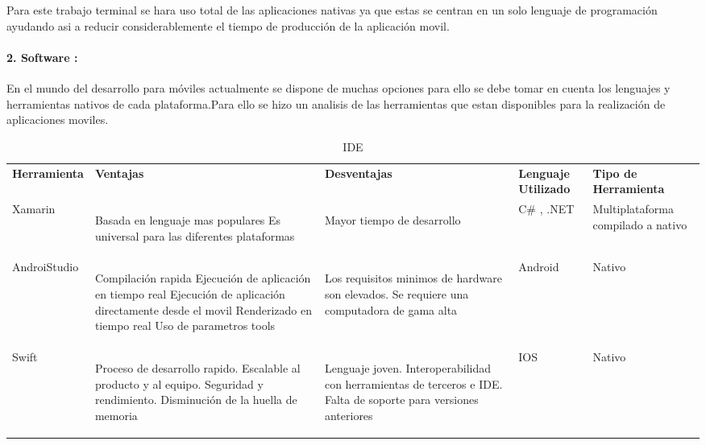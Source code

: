 Para este trabajo terminal se hara uso total de las aplicaciones nativas ya que estas se centran en un solo lenguaje de programación ayudando asi a reducir considerablemente el tiempo de producción de la aplicación movil.



\paragraph{2. Software :}
En el mundo del desarrollo para móviles actualmente se dispone de muchas opciones para ello se debe tomar en cuenta los lenguajes y herramientas nativos de cada plataforma.Para ello se hizo un analisis de las herramientas que estan disponibles para la realización de aplicaciones moviles.

\begin{table}[h!]
\begin{tabular}{|p{3cm}|p{3.5cm}|p{3cm}|p{3cm}|p{3cm}|}
\hline
\textbf{Herramienta}&\textbf{Ventajas}& \textbf{Desventajas}& \textbf{Lenguaje Utilizado} & \textbf{Tipo de Herramienta} \\
Xamarin & 	\begin{UClist}
				\UCli Basada en lenguaje mas populares
				\UCli Es universal para las diferentes plataformas
			\end{UClist} &
							\begin{UClist}
								\UCli Mayor tiempo de desarrollo
							\end{UClist} & C\# , .NET & Multiplataforma compilado a nativo \\
\hline
\hline
AndroiStudio & 	\begin{UClist}
					\UCli Compilación rapida
					\UCli Ejecución de aplicación en tiempo real
					\UCli Ejecución de aplicación directamente desde el movil
					\UCli Renderizado en tiempo real
					\UCli Uso de parametros tools
				\end{UClist} &
								\begin{UClist}
									\UCli Los requisitos minimos de hardware son elevados.
									\UCli Se requiere una computadora de gama alta
								\end{UClist} & Android & Nativo \\
\hline
\hline
Swift & \begin{UClist}
			\UCli Proceso de desarrollo rapido.
			\UCli Escalable al producto y al equipo.
			\UCli Seguridad y rendimiento.
			\UCli Disminución de la huella de memoria
		\end{UClist} & 
						\begin{UClist}
							\UCli Lenguaje joven.
							\UCli Interoperabilidad con herramientas de terceros e IDE.
							\UCli Falta de soporte para versiones anteriores
						\end{UClist} & IOS & Nativo \\
\hline


\end{tabular}
\caption{IDE}
\label{disenoEstructura:IDE}
\end{table}

